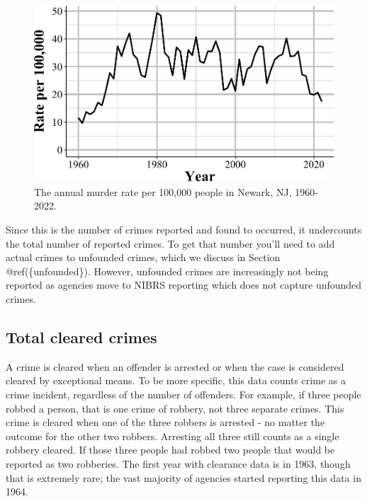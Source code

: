 \documentclass[
  12pt,
  openany]{book}
\begin{document}
\begin{figure}

{\centering \includegraphics[width=0.9\linewidth]{03_offenses_known_files/figure-latex/newarkMurders-1} 

}

\caption{The annual murder rate per 100,000 people in Newark, NJ, 1960-2022.}\label{fig:newarkMurders}
\end{figure}

Since this is the number of crimes reported and found to occurred, it undercounts the total number of reported crimes. To get that number you'll need to add actual crimes to unfounded crimes, which we discuss in Section @ref(\{unfounded\}). However, unfounded crimes are increasingly not being reported as agencies move to NIBRS reporting which does not capture unfounded crimes.

\subsection{Total cleared crimes}\label{clearedCrimes}

A crime is cleared when an offender is arrested or when the case is considered cleared by exceptional means. To be more specific, this data counts crime as a crime incident, regardless of the number of offenders. For example, if three people robbed a person, that is one crime of robbery, not three separate crimes. This crime is cleared when one of the three robbers is arrested - no matter the outcome for the other two robbers. Arresting all three still counts as a single robbery cleared. If those three people had robbed two people that would be reported as two robberies. The first year with clearance data is in 1963, though that is extremely rare; the vast majority of agencies started reporting this data in 1964.
\end{document}
